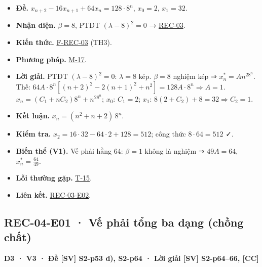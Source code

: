 \documentclass[
  10pt,
  twoside,openany]{book}
\providecommand{\tightlist}{%
  \setlength{\itemsep}{0pt}\setlength{\parskip}{0pt}}
\begin{document}
\begin{itemize}
\tightlist
\item
  \textbf{Đề.} \(x_{n+2}-16x_{n+1}+64x_n=128\cdot8^n\), \(x_0=2\),
  \(x_1=32\).
\item
  \textbf{Nhận diện.} \(\beta=8\), PTĐT \((\lambda-8)^2=0\) →
  \protect\hyperlink{REC-03}{REC-03}.
\item
  \textbf{Kiến thức.} \protect\hyperlink{F-REC-03}{F-REC-03} (TH3).
\item
  \textbf{Phương pháp.} \protect\hyperlink{M-17}{M-17}.
\item
  \textbf{Lời giải.} PTĐT \((\lambda-8)^2=0\): \(\lambda=8\) kép.
  \(\beta=8\) nghiệm kép ⇒ \(x_n^*=An^28^n\). Thế:
  \(64A\cdot8^n[(n+2)^2-2(n+1)^2+n^2]=128A\cdot8^n\Rightarrow A=1\).
  \(x_n=(C_1+nC_2)8^n+n^28^n\); \(x_0\): \(C_1=2\); \(x_1\):
  \(8(2+C_2)+8=32\Rightarrow C_2=1\).
\item
  \textbf{Kết luận.} \(x_n=(n^2+n+2)\,8^n\).
\item
  \textbf{Kiểm tra.} \(x_2=16\cdot32-64\cdot2+128=512\); công thức
  \(8\cdot64=512\) ✓.
\item
  \textbf{Biến thể (V1).} Vế phải hằng 64: \(\beta=1\) không là nghiệm ⇒
  \(49A=64\), \(x_n^*=\frac{64}{49}\).
\item
  \textbf{Lỗi thường gặp.} \protect\hyperlink{T-15}{T-15}.
\item
  \textbf{Liên kết.} \protect\hyperlink{REC-03-E02}{REC-03-E02}.
\end{itemize}

\hypertarget{REC-04-E01}{%
\subsection{REC-04-E01 · Vế phải tổng ba dạng (chồng
chất)}\label{REC-04-E01}}

\textbf{D3 · V3 · Đề {[}SV{]} S2-p53 d), S2-p64 · Lời giải {[}SV{]}
S2-p64--66, {[}CC{]}}
\end{document}
